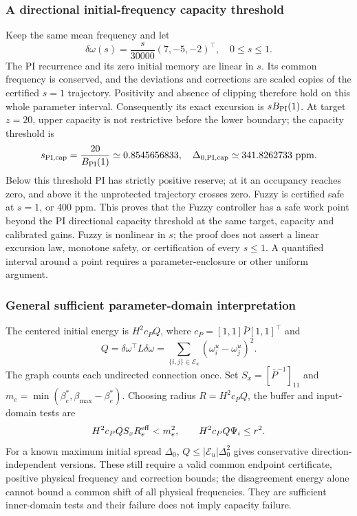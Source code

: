 \subsubsection{A directional initial-frequency capacity threshold}
Keep the same mean frequency and let
\[
 \delta\omega(s)=\frac{s}{30000}(7,-5,-2)^\top,
 \quad 0\le s\le1.
\]
The PI recurrence and its zero initial memory are linear in $s$.
Its common frequency is conserved, and the deviations and corrections
are scaled copies of the certified $s=1$ trajectory. Positivity and
absence of clipping therefore hold on this whole parameter interval.
Consequently its exact excursion is $sB_{\rm PI}(1)$.
At target $z=20$, upper capacity is not restrictive before the
lower boundary; the capacity threshold is
\begin{equation}
 s_{\rm PI,cap}=\frac{20}{B_{\rm PI}(1)}
 \simeq0.8545656833,
 \quad\Delta_{0,\rm PI,cap}\simeq341.8262733\ \mathrm{ppm}.
 \label{detail:eq:btd_pi_directional_capacity}
\end{equation}
Below this threshold PI has strictly positive reserve; at it an
occupancy reaches zero, and above it the unprotected trajectory
crosses zero. Fuzzy is certified safe at $s=1$, or 400 ppm.
This proves that the Fuzzy controller has a safe work point beyond
the PI directional capacity threshold at the same target, capacity
and calibrated gains. Fuzzy is nonlinear in $s$; the proof does not
assert a linear excursion law, monotone safety, or certification of
every $s\le1$. A quantified interval around a point requires a
parameter-enclosure or other uniform argument.

\subsubsection{General sufficient parameter-domain interpretation}
The centered initial energy is
$H^2c_PQ$, where $c_P=[1,1]\bar P[1,1]^\top$ and
\[
 Q=\delta\omega^\top L\delta\omega
 =\sum_{\{i,j\}\in\mathcal E_u}(\omega_i^u-\omega_j^u)^2.
\]
The graph counts each undirected connection once. Set
$S_x=[\bar P^{-1}]_{11}$ and $m_e=\min(\beta_e^*,\beta_{\max}-\beta_e^*)$.
Choosing radius $R=H^2c_PQ$, the buffer and input-domain tests are
\[
 H^2c_PQ S_xR_e^{\rm eff}<m_e^2,
 \qquad H^2c_PQ\Psi_i\le r^2.
\]
For a known maximum initial spread $\Delta_0$,
$Q\le|\mathcal E_u|\Delta_0^2$ gives conservative direction-independent
versions. These still require a valid common endpoint certificate,
positive physical frequency and correction bounds; the disagreement
energy alone cannot bound a common shift of all physical frequencies.
They are sufficient inner-domain tests and their failure does not
imply capacity failure.

